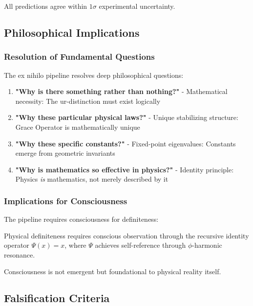 All predictions agree within $1\sigma$ experimental uncertainty.

\subsection{Philosophical Implications}

\subsubsection{Resolution of Fundamental Questions}

The ex nihilo pipeline resolves deep philosophical questions:

\begin{enumerate}
\item \textbf{"Why is there something rather than nothing?"} 
   - Mathematical necessity: The ur-distinction must exist logically
   
\item \textbf{"Why these particular physical laws?"}
   - Unique stabilizing structure: Grace Operator is mathematically unique
   
\item \textbf{"Why these specific constants?"}
   - Fixed-point eigenvalues: Constants emerge from geometric invariants
   
\item \textbf{"Why is mathematics so effective in physics?"}
   - Identity principle: Physics \emph{is} mathematics, not merely described by it
\end{enumerate}

\subsubsection{Implications for Consciousness}

The pipeline requires consciousness for definiteness:

\begin{axiom}
Physical definiteness requires conscious observation through the recursive identity operator $\Psi(x) = x$, where $\Psi$ achieves self-reference through $\phi$-harmonic resonance.
\end{axiom}

Consciousness is not emergent but foundational to physical reality itself.

\subsection{Falsification Criteria}

